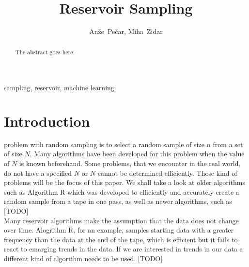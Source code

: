 \documentclass[journal]{IEEEtran/IEEEtran}
\begin{document}
\title{Reservoir Sampling}

\author{Anže~Pečar, Miha~Zidar}%


\maketitle

\begin{abstract}
The abstract goes here.
\end{abstract}

\begin{IEEEkeywords}
sampling, reservoir, machine learning.
\end{IEEEkeywords}

\IEEEpeerreviewmaketitle


\section{Introduction}
 problem with random sampling is to select a random sample of size $n$ from a set of size $N$. Many algorithms have been developed for this problem when the value of $N$ is known beforehand. Some problems, that we encounter in the real world, do not have a specified $N$ or $N$ cannot be determined efficiently. Those kind of problems will be the focus of this paper. We shall take a look at older algorithms such as Algorithm R which was developed to efficiently and accurately create a random sample from a tape in one pass, as well as newer algorithms, such as [TODO]\\

Many reservoir algorithms make the assumption that the data does not change over time. Alogrithm R, for an example, samples starting data with a greater frequency than the data at the end of the tape, which is efficient but it fails to react to emarging trends in the data. If we are interested in trends in our data a different kind of algorithm needs to be used. [TODO]\\\\
\end{document}
